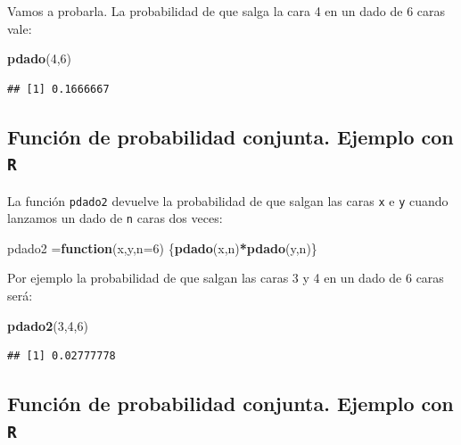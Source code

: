 \documentclass[]{book}
\newenvironment{Shaded}{\begin{snugshade}}{\end{snugshade}}
\newcommand{\ControlFlowTok}[1]{\textcolor[rgb]{0.13,0.29,0.53}{\textbf{#1}}}
\newcommand{\DataTypeTok}[1]{\textcolor[rgb]{0.13,0.29,0.53}{#1}}
\newcommand{\DecValTok}[1]{\textcolor[rgb]{0.00,0.00,0.81}{#1}}
\newcommand{\KeywordTok}[1]{\textcolor[rgb]{0.13,0.29,0.53}{\textbf{#1}}}
\newcommand{\NormalTok}[1]{#1}
\newcommand{\OperatorTok}[1]{\textcolor[rgb]{0.81,0.36,0.00}{\textbf{#1}}}
\begin{document}
Vamos a probarla. La probabilidad de que salga la cara 4 en un dado de 6 caras vale:

\begin{Shaded}
\begin{Highlighting}[]
\KeywordTok{pdado}\NormalTok{(}\DecValTok{4}\NormalTok{,}\DecValTok{6}\NormalTok{)}
\end{Highlighting}
\end{Shaded}

\begin{verbatim}
## [1] 0.1666667
\end{verbatim}

\hypertarget{funciuxf3n-de-probabilidad-conjunta.-ejemplo-con-r-1}{%
\subsection{\texorpdfstring{Función de probabilidad conjunta. Ejemplo con \texttt{R}}{Función de probabilidad conjunta. Ejemplo con R}}\label{funciuxf3n-de-probabilidad-conjunta.-ejemplo-con-r-1}}

La función \texttt{pdado2} devuelve la probabilidad de que salgan las caras \texttt{x} e \texttt{y} cuando lanzamos un dado de \texttt{n} caras dos veces:

\begin{Shaded}
\begin{Highlighting}[]
\NormalTok{pdado2 =}\ControlFlowTok{function}\NormalTok{(x,y,}\DataTypeTok{n=}\DecValTok{6}\NormalTok{) \{}\KeywordTok{pdado}\NormalTok{(x,n)}\OperatorTok{*}\KeywordTok{pdado}\NormalTok{(y,n)\}}
\end{Highlighting}
\end{Shaded}

Por ejemplo la probabilidad de que salgan las caras 3 y 4 en un dado de 6 caras será:

\begin{Shaded}
\begin{Highlighting}[]
\KeywordTok{pdado2}\NormalTok{(}\DecValTok{3}\NormalTok{,}\DecValTok{4}\NormalTok{,}\DecValTok{6}\NormalTok{)}
\end{Highlighting}
\end{Shaded}

\begin{verbatim}
## [1] 0.02777778
\end{verbatim}

\hypertarget{funciuxf3n-de-probabilidad-conjunta.-ejemplo-con-r-2}{%
\subsection{\texorpdfstring{Función de probabilidad conjunta. Ejemplo con \texttt{R}}{Función de probabilidad conjunta. Ejemplo con R}}\label{funciuxf3n-de-probabilidad-conjunta.-ejemplo-con-r-2}}
\end{document}
